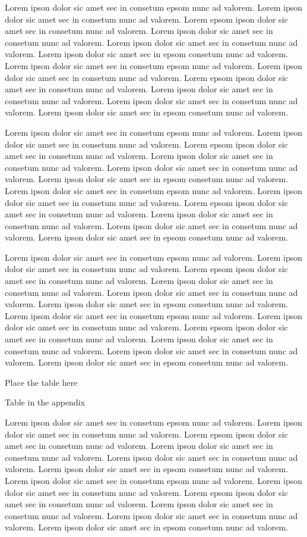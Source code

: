 Lorem ipson dolor sic amet sec in consetum epsom nunc ad valorem. Lorem ipson dolor sic amet
sec in consetum nunc ad valorem. Lorem epsom ipson dolor sic amet sec in consetum nunc ad valorem. 
Lorem ipson dolor sic amet sec in consetum nunc ad valorem. Lorem ipson dolor sic amet
sec in consetum nunc ad valorem. Lorem ipson dolor sic amet sec in epsom consetum nunc ad valorem.
Lorem ipson dolor sic amet sec in consetum epsom nunc ad valorem. Lorem ipson dolor sic amet
sec in consetum nunc ad valorem. Lorem epsom ipson dolor sic amet sec in consetum nunc ad valorem. 
Lorem ipson dolor sic amet sec in consetum nunc ad valorem. Lorem ipson dolor sic amet
sec in consetum nunc ad valorem. Lorem ipson dolor sic amet sec in epsom consetum nunc ad valorem.

Lorem ipson dolor sic amet sec in consetum epsom nunc ad valorem. Lorem ipson dolor sic amet
sec in consetum nunc ad valorem. Lorem epsom ipson dolor sic amet sec in consetum nunc ad valorem. 
Lorem ipson dolor sic amet sec in consetum nunc ad valorem. Lorem ipson dolor sic amet
sec in consetum nunc ad valorem. Lorem ipson dolor sic amet sec in epsom consetum nunc ad valorem.
Lorem ipson dolor sic amet sec in consetum epsom nunc ad valorem. Lorem ipson dolor sic amet
sec in consetum nunc ad valorem. Lorem epsom ipson dolor sic amet sec in consetum nunc ad valorem. 
Lorem ipson dolor sic amet sec in consetum nunc ad valorem. Lorem ipson dolor sic amet
sec in consetum nunc ad valorem. Lorem ipson dolor sic amet sec in epsom consetum nunc ad valorem.

Lorem ipson dolor sic amet sec in consetum epsom nunc ad valorem. Lorem ipson dolor sic amet
sec in consetum nunc ad valorem. Lorem epsom ipson dolor sic amet sec in consetum nunc ad valorem. 
Lorem ipson dolor sic amet sec in consetum nunc ad valorem. Lorem ipson dolor sic amet
sec in consetum nunc ad valorem. Lorem ipson dolor sic amet sec in epsom consetum nunc ad valorem.
Lorem ipson dolor sic amet sec in consetum epsom nunc ad valorem. Lorem ipson dolor sic amet
sec in consetum nunc ad valorem. Lorem epsom ipson dolor sic amet sec in consetum nunc ad valorem. 
Lorem ipson dolor sic amet sec in consetum nunc ad valorem. Lorem ipson dolor sic amet
sec in consetum nunc ad valorem. Lorem ipson dolor sic amet sec in epsom consetum nunc ad valorem.
\begin{table}
Place the table here
\caption{Table in the appendix}
\end{table}
Lorem ipson dolor sic amet sec in consetum epsom nunc ad valorem. Lorem ipson dolor sic amet
sec in consetum nunc ad valorem. Lorem epsom ipson dolor sic amet sec in consetum nunc ad valorem. 
Lorem ipson dolor sic amet sec in consetum nunc ad valorem. Lorem ipson dolor sic amet
sec in consetum nunc ad valorem. Lorem ipson dolor sic amet sec in epsom consetum nunc ad valorem.
Lorem ipson dolor sic amet sec in consetum epsom nunc ad valorem. Lorem ipson dolor sic amet
sec in consetum nunc ad valorem. Lorem epsom ipson dolor sic amet sec in consetum nunc ad valorem. 
Lorem ipson dolor sic amet sec in consetum nunc ad valorem. Lorem ipson dolor sic amet
sec in consetum nunc ad valorem. Lorem ipson dolor sic amet sec in epsom consetum nunc ad valorem.

